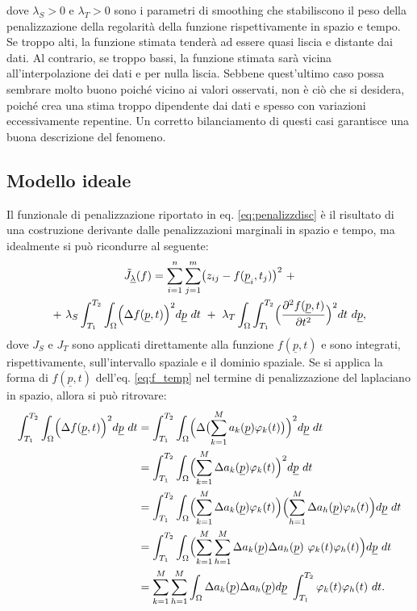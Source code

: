 \documentclass[a4paper,11pt,twoside,openright]{book}							%
\begin{document}
dove $\lambda_S>0$ e $\lambda_T>0$ sono i parametri di smoothing che stabiliscono il peso della penalizzazione della regolarità della funzione rispettivamente in spazio e tempo. Se troppo alti, la funzione stimata tenderà ad essere quasi liscia e distante dai dati. Al contrario, se troppo bassi, la funzione stimata sarà vicina all'interpolazione dei dati e per nulla liscia. Sebbene quest'ultimo caso possa sembrare molto buono poiché vicino ai valori osservati, non è ciò che si desidera, poiché crea una stima troppo dipendente dai dati e spesso con variazioni eccessivamente repentine. Un corretto bilanciamento di questi casi garantisce una buona descrizione del fenomeno.



\subsection{Modello ideale}
Il funzionale di penalizzazione riportato in eq. \ref{eq:penalizzdisc} è il risultato di una costruzione derivante dalle penalizzazioni marginali in spazio e tempo, ma idealmente si può ricondurre al seguente:
\begin{multline}
\label{eq:Jfunc_cont}
\tilde J_{\underline \lambda }(f) = \sum_{i=1}^n \sum_{j=1}^m \bigl( z_{ij} - f(\underline p_i,t_j) \bigr)^2 \ + \\+\   \lambda_S \int_{T_1}^{T_2} \int_\Omega \Bigl( \Delta f(\underline p, t)  \Bigr)^2 d\underline p\ dt \ +\  \lambda_T \int_\Omega \int_{T_1}^{T_2} \Bigl( \frac{\partial^2 f(\underline p, t) }{\partial t ^2} \Bigr)^2 dt\ d\underline p ,
\end{multline}
dove $J_S$ e $J_T$ sono applicati direttamente alla funzione $f(\underline p, t)$ e sono integrati, rispettivamente, sull'intervallo spaziale e il dominio spaziale. Se si applica la forma di $f(\underline p,t)$ dell'eq. \ref{eq:f_temp} nel termine di penalizzazione del laplaciano in spazio, allora si può ritrovare:
\begin{equation} 
\label{eq:espansione_funzinf_t}
\begin{split}
\int_{T_1}^{T_2} \int_\Omega \Bigl( \Delta f(\underline p, t)  \Bigr)^2 d\underline p\ dt 
&=\int_{T_1}^{T_2} \int_\Omega \Bigl( \Delta \bigl( \sum_{k=1}^M a_k(\underline p) \varphi_k(t) \bigr)  \Bigr)^2 d\underline p\ dt \\
&=\int_{T_1}^{T_2} \int_\Omega \Bigl( \sum_{k=1}^M \Delta a_k(\underline p) \varphi_k(t)  \Bigr)^2 d\underline p\ dt \\
&=\int_{T_1}^{T_2} \int_\Omega \Bigl( \sum_{k=1}^M \Delta a_k(\underline p) \varphi_k(t)  \Bigr)\Bigl( \sum_{h=1}^M \Delta a_h(\underline p) \varphi_h(t)  \Bigr) d\underline p\ dt \\
&=\int_{T_1}^{T_2} \int_\Omega \Bigl( \sum_{k=1}^M \sum_{h=1}^M \Delta a_k(\underline p)\Delta a_h(\underline p)\ \varphi_k(t)  \varphi_h(t)  \Bigr) d\underline p\ dt \\
&=\sum_{k=1}^M \sum_{h=1}^M \int_\Omega   \Delta a_k(\underline p) \Delta a_h(\underline p)d\underline p \ \int_{T_1}^{T_2} \varphi_k(t)\varphi_h(t)   \ dt .
\end{split}
\end{equation}
\end{document}
